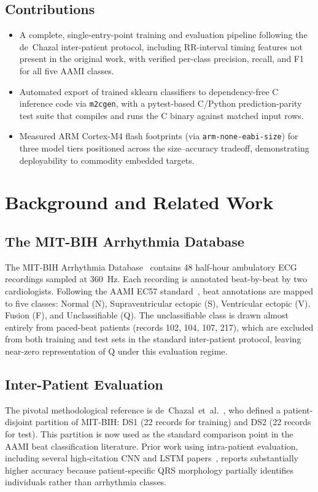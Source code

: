 \documentclass[journal,twoside]{IEEEtran}
\begin{document}
\subsection*{Contributions}
\begin{itemize}
  \item A complete, single-entry-point training and evaluation pipeline
        following the de~Chazal inter-patient protocol, including RR-interval
        timing features not present in the original work, with verified
        per-class precision, recall, and F1 for all five AAMI classes.
  \item Automated export of trained sklearn classifiers to dependency-free
        C inference code via \texttt{m2cgen}, with a pytest-based C/Python
        prediction-parity test suite that compiles and runs the C binary
        against matched input rows.
  \item Measured ARM Cortex-M4 flash footprints (via \texttt{arm-none-eabi-size})
        for three model tiers positioned across the size--accuracy tradeoff,
        demonstrating deployability to commodity embedded targets.
\end{itemize}

\section{Background and Related Work}

\subsection{The MIT-BIH Arrhythmia Database}
The MIT-BIH Arrhythmia Database~\cite{Moody2001,Goldberger2000} contains
48 half-hour ambulatory ECG recordings sampled at 360~Hz. Each recording
is annotated beat-by-beat by two cardiologists. Following the AAMI EC57
standard~\cite{AAMI2008}, beat annotations are mapped to five classes:
Normal (N), Supraventricular ectopic (S), Ventricular ectopic (V),
Fusion (F), and Unclassifiable (Q). The unclassifiable class is drawn
almost entirely from paced-beat patients (records 102, 104, 107, 217),
which are excluded from both training and test sets in the standard
inter-patient protocol, leaving near-zero representation of Q under this
evaluation regime.

\subsection{Inter-Patient Evaluation}
The pivotal methodological reference is de~Chazal~et~al.~\cite{deChazal2004},
who defined a patient-disjoint partition of MIT-BIH: DS1 (22 records for
training) and DS2 (22 records for test). This partition is now used as the
standard comparison point in the AAMI beat classification literature.
Prior work using intra-patient evaluation, including several high-citation
CNN and LSTM papers~\cite{Kiranyaz2016,Acharya2017}, reports
substantially higher accuracy because patient-specific QRS morphology
partially identifies individuals rather than arrhythmia classes.
\end{document}

